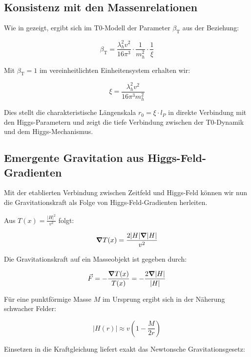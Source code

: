 \documentclass[12pt,a4paper]{article}
\newcommand{\Tfield}{T(x)}
\newcommand{\betaT}{\beta_{\text{T}}}
\begin{document}
	\subsection{Konsistenz mit den Massenrelationen}
	Wie in \cite{pascher_params_2025} gezeigt, ergibt sich im T0-Modell der Parameter \(\betaT\) aus der Beziehung:
	
	\begin{equation}
		\betaT = \frac{\lambda_h^2 v^2}{16\pi^3} \cdot \frac{1}{m_h^2} \cdot \frac{1}{\xi}
	\end{equation}
	
	Mit \(\betaT = 1\) im vereinheitlichten Einheitensystem erhalten wir:
	
	\begin{equation}
		\xi = \frac{\lambda_h^2 v^2}{16\pi^3 m_h^2}
	\end{equation}
	
	Dies stellt die charakteristische Längenskala \(r_0 = \xi \cdot l_P\) in direkte Verbindung mit den Higgs-Parametern und zeigt die tiefe Verbindung zwischen der T0-Dynamik und dem Higgs-Mechanismus.
	
	\subsection{Emergente Gravitation aus Higgs-Feld-Gradienten}
	Mit der etablierten Verbindung zwischen Zeitfeld und Higgs-Feld können wir nun die Gravitationskraft als Folge von Higgs-Feld-Gradienten herleiten.
	
	Aus \(\Tfield = \frac{|H|^2}{v^2}\) folgt:
	
	\begin{equation}
		\grad \Tfield = \frac{2|H|\grad|H|}{v^2}
	\end{equation}
	
	Die Gravitationskraft auf ein Masseobjekt ist gegeben durch:
	
	\begin{equation}
		\vec{F} = -\frac{\grad \Tfield}{\Tfield} = -\frac{2\grad|H|}{|H|}
	\end{equation}
	
	Für eine punktförmige Masse \(M\) im Ursprung ergibt sich in der Näherung schwacher Felder:
	
	\begin{equation}
		|H(r)| \approx v\left(1 - \frac{M}{2r}\right)
	\end{equation}
	
	Einsetzen in die Kraftgleichung liefert exakt das Newtonsche Gravitationsgesetz:
	
\end{document}
